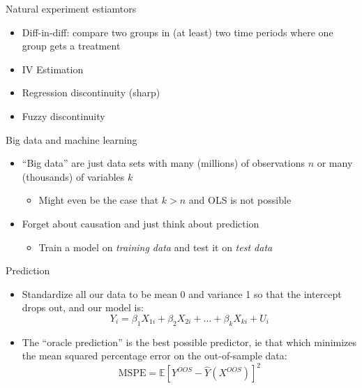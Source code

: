\documentclass[aspectratio=169]{beamer}
\begin{document}
\begin{frame}{Natural experiment estiamtors}
    \begin{itemize}
        \item Diff-in-diff: compare two groups in (at least) two time periods where one group gets a treatment
        \item IV Estimation
        \item Regression discontinuity (sharp)
        \item Fuzzy discontinuity
    \end{itemize}
\end{frame}

\begin{frame}{Big data and machine learning}
    \begin{itemize}
        \item ``Big data'' are just data sets with many (millions) of observations $n$ or many (thousands) of variables $k$
        \begin{itemize}
            \item Might even be the case that $k > n$ and OLS is not possible
        \end{itemize}
        \item Forget about causation and just think about prediction
        \begin{itemize}
            \item Train a model on \textit{training data} and test it on \textit{test data}
        \end{itemize}
    \end{itemize}
\end{frame}

\begin{frame}{Prediction}
    \begin{itemize}
        \item Standardize all our data to be mean 0 and variance 1 so that the intercept drops out, and our model is:
        $$
        Y_i=\beta_1 X_{1 i}+\beta_2 X_{2 i}+\ldots+\beta_k X_{k i}+U_i
        $$
        \item The ``oracle prediction'' is the best possible predictor, ie that which minimizes the mean squared percentage error on the out-of-sample data:
        $$
        \text{MSPE} = \mathbb{E}\left[Y^{OOS}-\hat{Y}\left(X^{OOS}\right)\right]^2
        $$
    \end{itemize}
\end{frame}
\end{document}

